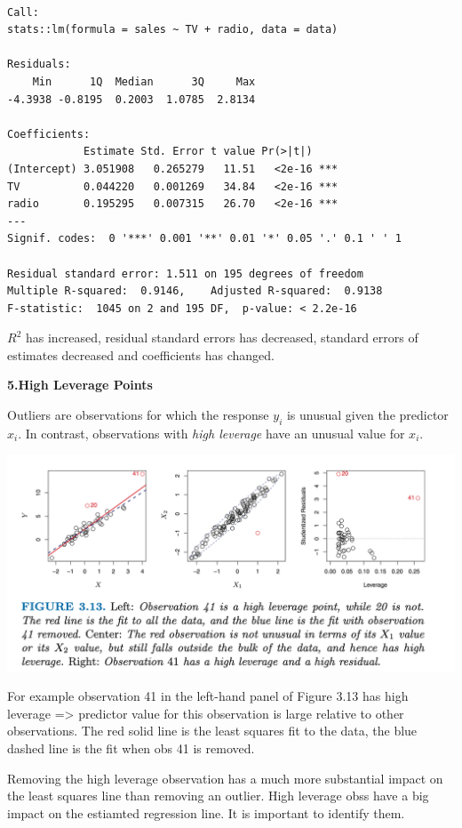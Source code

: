 \documentclass[
  letterpaper,
  DIV=11,
  numbers=noendperiod]{scrreprt}
\begin{document}
\begin{verbatim}

Call:
stats::lm(formula = sales ~ TV + radio, data = data)

Residuals:
    Min      1Q  Median      3Q     Max 
-4.3938 -0.8195  0.2003  1.0785  2.8134 

Coefficients:
            Estimate Std. Error t value Pr(>|t|)    
(Intercept) 3.051908   0.265279   11.51   <2e-16 ***
TV          0.044220   0.001269   34.84   <2e-16 ***
radio       0.195295   0.007315   26.70   <2e-16 ***
---
Signif. codes:  0 '***' 0.001 '**' 0.01 '*' 0.05 '.' 0.1 ' ' 1

Residual standard error: 1.511 on 195 degrees of freedom
Multiple R-squared:  0.9146,    Adjusted R-squared:  0.9138 
F-statistic:  1045 on 2 and 195 DF,  p-value: < 2.2e-16
\end{verbatim}

\(R^2\) has increased, residual standard errors has decreased, standard
errors of estimates decreased and coefficients has changed.

\textbf{5.High Leverage Points}

Outliers are observations for which the response \(y_i\) is unusual
given the predictor \(x_i\). In contrast, observations with \emph{high
leverage} have an unusual value for \(x_i\).

\includegraphics{fig3.13.png}

For example observation 41 in the left-hand panel of Figure 3.13 has
high leverage =\textgreater{} predictor value for this observation is
large relative to other observations. The red solid line is the least
squares fit to the data, the blue dashed line is the fit when obs 41 is
removed.

Removing the high leverage observation has a much more substantial
impact on the least squares line than removing an outlier. High leverage
obss have a big impact on the estiamted regression line. It is important
to identify them.
\end{document}
